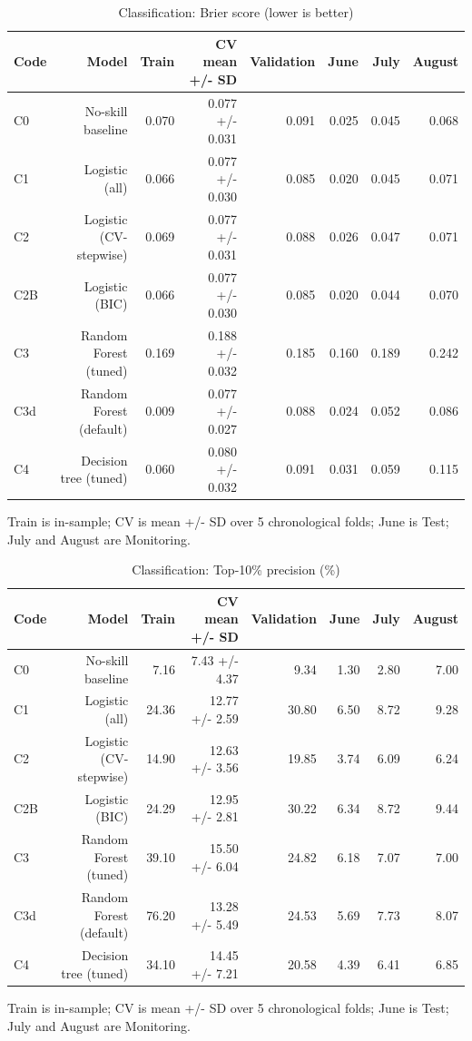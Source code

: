 \begin{table}[htbp]
\centering
\small
\caption{Classification: Brier score (lower is better)}
\begin{tabular}{lrrrrrrr}
\toprule
Code & Model & Train & CV mean +/- SD & Validation & June & July & August \\
\midrule
C0 & No-skill baseline & 0.070 & 0.077 +/- 0.031 & 0.091 & 0.025 & 0.045 & 0.068 \\
C1 & Logistic (all) & 0.066 & 0.077 +/- 0.030 & 0.085 & 0.020 & 0.045 & 0.071 \\
C2 & Logistic (CV-stepwise) & 0.069 & 0.077 +/- 0.031 & 0.088 & 0.026 & 0.047 & 0.071 \\
C2B & Logistic (BIC) & 0.066 & 0.077 +/- 0.030 & 0.085 & 0.020 & 0.044 & 0.070 \\
C3 & Random Forest (tuned) & 0.169 & 0.188 +/- 0.032 & 0.185 & 0.160 & 0.189 & 0.242 \\
C3d & Random Forest (default) & 0.009 & 0.077 +/- 0.027 & 0.088 & 0.024 & 0.052 & 0.086 \\
C4 & Decision tree (tuned) & 0.060 & 0.080 +/- 0.032 & 0.091 & 0.031 & 0.059 & 0.115 \\
\bottomrule
\end{tabular}
\par\smallskip\begin{minipage}{\linewidth}\footnotesize Train is in-sample; CV is mean +/- SD over 5 chronological folds; June is Test; July and August are Monitoring.\end{minipage}
\end{table}


\begin{table}[htbp]
\centering
\small
\caption{Classification: Top-10\% precision (\%)}
\begin{tabular}{lrrrrrrr}
\toprule
Code & Model & Train & CV mean +/- SD & Validation & June & July & August \\
\midrule
C0 & No-skill baseline & 7.16 & 7.43 +/- 4.37 & 9.34 & 1.30 & 2.80 & 7.00 \\
C1 & Logistic (all) & 24.36 & 12.77 +/- 2.59 & 30.80 & 6.50 & 8.72 & 9.28 \\
C2 & Logistic (CV-stepwise) & 14.90 & 12.63 +/- 3.56 & 19.85 & 3.74 & 6.09 & 6.24 \\
C2B & Logistic (BIC) & 24.29 & 12.95 +/- 2.81 & 30.22 & 6.34 & 8.72 & 9.44 \\
C3 & Random Forest (tuned) & 39.10 & 15.50 +/- 6.04 & 24.82 & 6.18 & 7.07 & 7.00 \\
C3d & Random Forest (default) & 76.20 & 13.28 +/- 5.49 & 24.53 & 5.69 & 7.73 & 8.07 \\
C4 & Decision tree (tuned) & 34.10 & 14.45 +/- 7.21 & 20.58 & 4.39 & 6.41 & 6.85 \\
\bottomrule
\end{tabular}
\par\smallskip\begin{minipage}{\linewidth}\footnotesize Train is in-sample; CV is mean +/- SD over 5 chronological folds; June is Test; July and August are Monitoring.\end{minipage}
\end{table}


